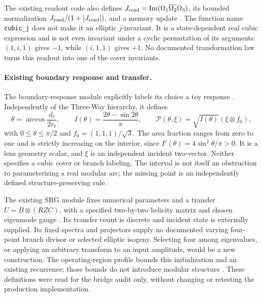 The existing readout code also defines \(J_{\rm read}=\operatorname{Im}(\Omega_1\overline{\Omega_2}\Omega_3)\), its bounded normalization \(J_{\rm read}/(1+|J_{\rm read}|)\), and a memory update \cite{readout}. The function name \texttt{cubic\_j} does not make it an elliptic \(j\)-invariant. It is a state-dependent real cubic expression and is not even invariant under a cyclic permutation of its arguments: \((1,i,1)\) gives \(-1\), while \((i,1,1)\) gives \(+1\). No documented transformation law turns this readout into one of the cover invariants.

\paragraph{Existing boundary response and transfer.}
The boundary-response module explicitly labels its choice a toy response \cite{boundary}. Independently of the Three-Way hierarchy, it defines
\begin{equation}\label{eq:lens}
 \theta=\arccos\frac{d_\ell}{2r_\ell},\qquad
 I(\theta)=\frac{2\theta-\sin2\theta}{\pi},\qquad
 \mathcal P(\theta,\xi)=\sqrt{I(\theta)}(\xi\otimes f_0),
\end{equation}
with \(0\le\theta\le\pi/2\) and \(f_0=(1,1,1)/\sqrt3\). The area fraction ranges from zero to one and is strictly increasing on the interior, since \(I'(\theta)=4\sin^2\theta/\pi>0\). It is a lens geometry scalar, and \(\xi\) is an independent incident two-vector. Neither specifies a cubic cover or branch labeling. The interval is not itself an obstruction to parameterizing a real modular arc; the missing point is an independently defined structure-preserving rule.

The existing SRG module fixes numerical parameters and a transfer \(U=B\otimes(RZC)\), with a specified two-by-two helicity matrix and chosen eigenmode gauge \cite{srg}. Its transfer count is discrete and incident state is externally supplied. Its fixed spectra and projectors supply no documented varying four-point branch divisor or selected elliptic isogeny. Selecting four among eigenvalues, or applying an arbitrary transform to an input amplitude, would be a new construction. The operating-region profile bounds this initialization and an existing recurrence; those bounds do not introduce modular structure \cite{operating}. These definitions were read for the bridge audit only, without changing or retesting the production implementation.

